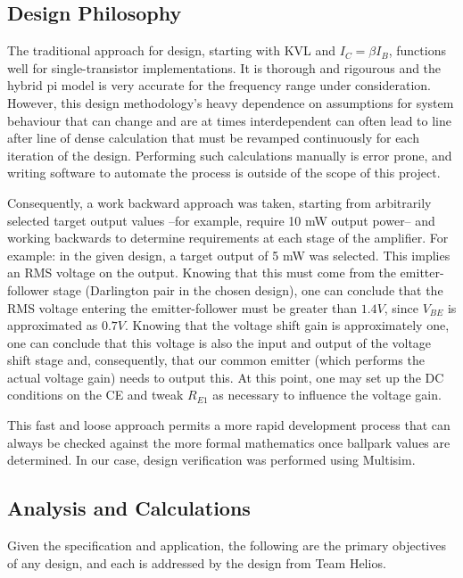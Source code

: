 \documentclass[journal]{IEEEtran}
\begin{document}
\subsection{Design Philosophy}

The traditional approach for design, starting with KVL and $I_{C}=\beta I_{B}$, functions well for single-transistor implementations. It is thorough and rigourous and the hybrid pi model is very accurate for the frequency range under consideration. However, this design methodology's heavy dependence on assumptions for system behaviour that can change and are at times interdependent can often lead to line after line of dense calculation that must be revamped continuously for each iteration of the design. Performing such calculations manually is error prone, and writing software to automate the process is outside of the scope of this project. 

Consequently, a work backward approach was taken, starting from arbitrarily selected target output values --for example, require 10 mW output power-- and working backwards to determine requirements at each stage of the amplifier. For example: in the given design, a target output of 5 mW was selected. This implies an RMS voltage on the output. Knowing that this must come from the emitter-follower stage (Darlington pair in the chosen design), one can conclude that the RMS voltage entering the emitter-follower must be greater than $1.4 V$, since $V_{BE}$ is approximated as $0.7 V$. Knowing that the voltage shift gain is approximately one, one can conclude that this voltage is also the input and output of the voltage shift stage and, consequently, that our common emitter (which performs the actual voltage gain) needs to output this. At this point, one may set up the DC conditions on the CE and tweak $R_{E1}$ as necessary to influence the voltage gain.

This fast and loose approach permits a more rapid development process that can always be checked against the more formal mathematics once ballpark values are determined. In our case, design verification was performed using Multisim.

\subsection{Analysis and Calculations}

Given the specification and application, the following are the primary objectives of any design, and each is addressed by the design from Team Helios.
\end{document}
